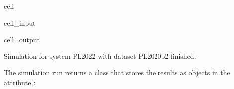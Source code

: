 \documentclass[letterpaper,10pt,english]{sphinxmanual}
\begin{document}
\begin{sphinxuseclass}{cell}
\begin{sphinxuseclass}{cell_input}
\begin{sphinxVerbatim}[commandchars=\\\{\}]
\PYG{p}{[}\PYG{p}{]}\PYG{p}{[}\PYG{p}{]}
\end{sphinxVerbatim}

\end{sphinxuseclass}
\begin{sphinxuseclass}{cell_output}
\begin{sphinxVerbatim}[commandchars=\\\{\}]
Simulation for system PL\PYGZus{}2022 with dataset PL\PYGZus{}2020\PYGZus{}b2 finished.
\end{sphinxVerbatim}

\end{sphinxuseclass}
\end{sphinxuseclass}
\sphinxAtStartPar
The simulation run returns a  class that stores the results as  objects in the attribute :
\end{document}
